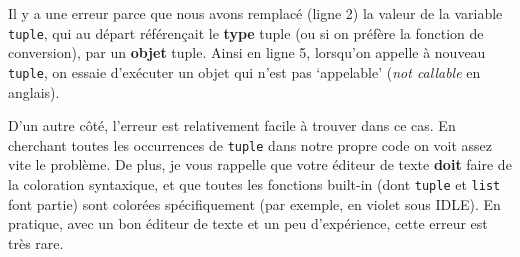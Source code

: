     Il y a une erreur parce que nous avons remplacé (ligne 2) la valeur de
la variable \texttt{tuple}, qui au départ référençait le \textbf{type}
tuple (ou si on préfère la fonction de conversion), par un
\textbf{objet} tuple. Ainsi en ligne 5, lorsqu'on appelle à nouveau
\texttt{tuple}, on essaie d'exécuter un objet qui n'est pas `appelable'
(\emph{not callable} en anglais).

D'un autre côté, l'erreur est relativement facile à trouver dans ce cas.
En cherchant toutes les occurrences de \texttt{tuple} dans notre propre
code on voit assez vite le problème. De plus, je vous rappelle que votre
éditeur de texte \textbf{doit} faire de la coloration syntaxique, et que
toutes les fonctions built-in (dont \texttt{tuple} et \texttt{list} font
partie) sont colorées spécifiquement (par exemple, en violet sous IDLE).
En pratique, avec un bon éditeur de texte et un peu d'expérience, cette
erreur est très rare.


    
    
    
